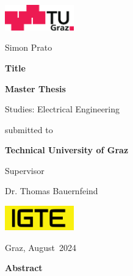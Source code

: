 \documentclass[11pt]{article}
\begin{document}
{}

\begin{titlepage}	
	{\sffamily		
		\begin{center}			
			\includegraphics[width=30mm]{images/TU_Graz_Logo.png}
			
			\vfill\vfill\vfill
			\vfill\vfill\vfill
			
			{Simon Prato}
			
			\vfill\vfill\vfill
			
			{\LARGE\bfseries{Title}}
			
			\vfill\vfill\vfill
			\vfill\vfill\vfill			
			
			{\bfseries\large{Master Thesis}}
			
			{Studies: {Electrical Engineering}}
						
			\vfill\vfill\vfill			
			
			submitted to
			
			\vfill
			
			{\bfseries\large{Technical University of Graz}}			
			
			\vfill\vfill\vfill			
			
			Supervisor
			
			{Dr. Thomas Bauernfeind}
			
			\vfill
			
			\vfill
			
			\includegraphics[width=30mm]{Documentation/images/igte_logo.png}
			
					
			\vfill\vfill\vfill
					
			{Graz}, {August}~{2024}
			
		\end{center}
	}%
\end{titlepage}

\newpage

\iftrue
\cleardoublepage
\setcounter{page}{2}
\vspace*{2.2 cm}
{\Large
\noindent
{\bf Abstract}} \\
\vspace*{0.3 cm}
\end{document}
